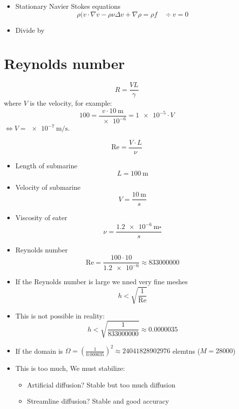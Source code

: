 \documentclass[openany,a4paper,11pt]{memoir}
\theoremstyle{definition}
\begin{document}
\begin{itemize}
\item Stationary Navier Stokes equations \[\rho(v\cdot \nabla v-\rho\nu\Delta v+\nabla \rho=\rho f \quad \div v=0 \]
  
\item Divide by
  
\end{itemize}

\section{Reynolds number}

\[R=\frac{V L}{\gamma} \]
where $V$ is the velocity, for example: \[ 100=\frac{v\cdot \SI{10}{\meter}}{\num{e-6}}=\num{1e-5}\cdot V \] $\iff V=\SI{e-7}{\metre\per\second}$.

\[ \mathrm{Re}=\frac{V\cdot L}{\nu}\]

\begin{itemize}
\item Length of submarine \[ L=\SI{100}{\metre}\]
  
\item Velocity of submarine \[V=\frac{\SI{10}{\metre}}s{} \]
  
\item Viscosity of eater \[ \nu = \frac{\SI{1.2e-6}{\metre\square}}{s} \]
  
\item Reynolds number \[ \text{Re}=\frac{100\cdot 10}{\num{1.2e-6}}\approx 833000000 \]

\end{itemize}

\begin{itemize}
\item If the Reynolds number is large we nned very fine meshes \[ h<\sqrt{\frac{1}{\mathrm{Re}}}\]
  
\item This is not possible in reality: \[ h<\sqrt{\frac{1}{833000000}}\approx 0.0000035 \]
  
\item If the domain is $\Omega={(\frac{1}{0.000035})}^{2}\approx 24041828902976$ elemtns ($M=28 000$)
  
\item This is too much, We must stabilize:

  \begin{itemize}
  \item Artificial diffusion? Stable but too much diffusion
    
  \item Streamline diffusion? Stable and good accuracy
  \end{itemize}
\end{itemize}
\end{document}
